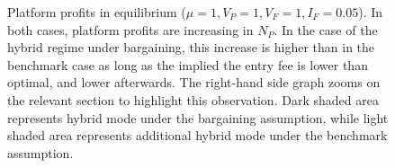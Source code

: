\begin{figure}
\begin{subfigure}[b]{0.45\textwidth}
        \caption{}
    \end{subfigure}
    \caption{Platform profits in equilibrium ($\mu = 1, V_P = 1, V_F = 1, I_F = 0.05$). In both cases, platform profits are increasing in $N_P$. In the case of the hybrid regime under bargaining, this increase is higher than in the benchmark case as long as the implied the entry fee is lower than optimal, and lower afterwards. The right-hand side graph zooms on the relevant section to highlight this observation. Dark shaded area represents hybrid mode under the bargaining assumption, while light shaded area represents additional hybrid mode under the benchmark assumption.}
    \label{fig:platform_profits}
\end{figure}

